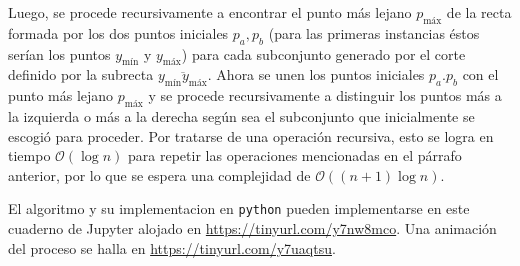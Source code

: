 \documentclass[paper=leter, fontsize=11pt]{scrartcl}
\numberwithin{equation}{section}		%
\numberwithin{figure}{section}			%
\numberwithin{table}{section}				%
\begin{document}
Luego, se procede recursivamente a encontrar el punto más lejano $p_{\text{máx}}$ de la recta formada por los dos puntos iniciales $p_a, p_b$ (para las primeras instancias éstos serían los puntos $y_{\text{mín}}$ y $y_{\text{máx}}$) para cada subconjunto generado por el corte definido por la subrecta $\overline{y_{\text{mín}} y_{\text{máx}}}$. Ahora se unen los puntos iniciales $p_a. p_b$ con el punto más lejano $p_{\text{máx}}$ y se procede recursivamente a distinguir los puntos más a la izquierda o más a la derecha según sea el subconjunto que inicialmente se escogió para proceder. Por tratarse de una operación recursiva, esto se logra en tiempo $\mathcal{O}(\log{n})$ para repetir las operaciones mencionadas en el párrafo anterior, por lo que se espera una complejidad de $\mathcal{O}((n + 1) \log{n})$.

El algoritmo y su implementacion en \texttt{python} pueden implementarse en este cuaderno de Jupyter alojado en \url{https://tinyurl.com/y7nw8mco}. Una animación del proceso se halla en \url{https://tinyurl.com/y7uaqtsu}.



\end{document}
